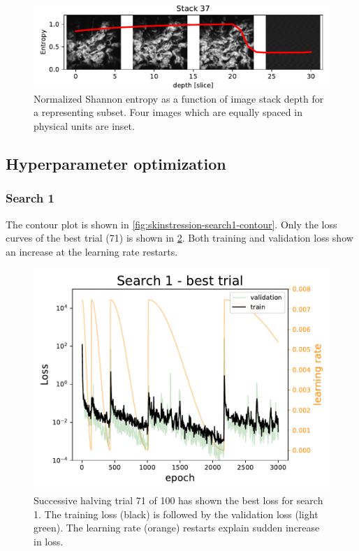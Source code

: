 \begin{figure}
    \includegraphics[width=\linewidth]{skinstression/images/entropy/37.pdf}
    \caption[Shannon entropy vs image stack depth]{
        Normalized Shannon entropy as a function of image stack depth for a representing subset.
        Four images which are equally spaced in physical units are inset.
    }
    \label{fig:skin_entropy_depth}
\end{figure}


\subsection{Hyperparameter optimization}

\subsubsection{Search 1}
The contour plot is shown in \cref{fig:skinstression-search1-contour}.
Only the loss curves of the best trial (71) is shown in \cref{fig:skinstression-search1-best-loss}.
Both training and validation loss show an increase at the learning rate restarts.

\begin{figure}
    \centering
    \includegraphics[]{skinstression/images/hyperparameter-search/search-1/best-trial-loss.pdf}
    \caption[Best loss curve of search 1]{
        Successive halving trial 71 of 100 has shown the best loss for search 1.
        The training loss (black) is followed by the validation loss (light green).
        The learning rate (orange) restarts explain sudden increase in loss.
    }
    \label{fig:skinstression-search1-best-loss}
\end{figure}

